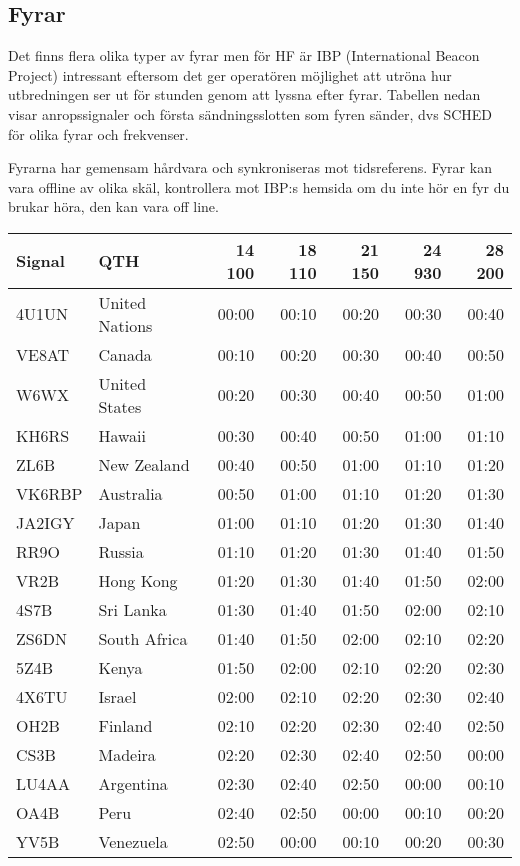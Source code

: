 \subsection{Fyrar}

Det finns flera olika typer av fyrar men för HF är IBP (International Beacon Project) intressant eftersom det ger operatören möjlighet att utröna hur utbredningen ser ut för stunden genom att lyssna efter fyrar. Tabellen nedan visar anropssignaler och första sändningsslotten som fyren sänder, dvs SCHED för olika fyrar och frekvenser.

Fyrarna har gemensam hårdvara och synkroniseras mot tidsreferens. Fyrar kan vara offline av olika skäl, kontrollera mot IBP:s hemsida om du inte hör en fyr du brukar höra, den kan vara off line.

\begin{tabular}{llrrrrr}
\hline
Signal & QTH            & 14 100 & 18 110 & 21 150 & 24 930 & 28 200 \\ \hline
4U1UN  & United Nations & 00:00  & 00:10  & 00:20  & 00:30  & 00:40  \\ 
VE8AT  & Canada         & 00:10  & 00:20  & 00:30  & 00:40  & 00:50  \\
W6WX   & United States  & 00:20  & 00:30  & 00:40  & 00:50  & 01:00  \\
KH6RS  & Hawaii         & 00:30  & 00:40  & 00:50  & 01:00  & 01:10  \\
ZL6B   & New Zealand    & 00:40  & 00:50  & 01:00  & 01:10  & 01:20  \\
VK6RBP & Australia      & 00:50  & 01:00  & 01:10  & 01:20  & 01:30  \\
JA2IGY & Japan          & 01:00  & 01:10  & 01:20  & 01:30  & 01:40  \\
RR9O   & Russia         & 01:10  & 01:20  & 01:30  & 01:40  & 01:50  \\
VR2B   & Hong Kong      & 01:20  & 01:30  & 01:40  & 01:50  & 02:00  \\
4S7B   & Sri Lanka      & 01:30  & 01:40  & 01:50  & 02:00  & 02:10  \\
ZS6DN  & South Africa   & 01:40  & 01:50  & 02:00  & 02:10  & 02:20  \\
5Z4B   & Kenya          & 01:50  & 02:00  & 02:10  & 02:20  & 02:30  \\
4X6TU  & Israel         & 02:00  & 02:10  & 02:20  & 02:30  & 02:40  \\
OH2B   & Finland        & 02:10  & 02:20  & 02:30  & 02:40  & 02:50  \\
CS3B   & Madeira        & 02:20  & 02:30  & 02:40  & 02:50  & 00:00  \\
LU4AA  & Argentina      & 02:30  & 02:40  & 02:50  & 00:00  & 00:10  \\
OA4B   & Peru           & 02:40  & 02:50  & 00:00  & 00:10  & 00:20  \\
YV5B   & Venezuela      & 02:50  & 00:00  & 00:10  & 00:20  & 00:30  \\
\end{tabular}

